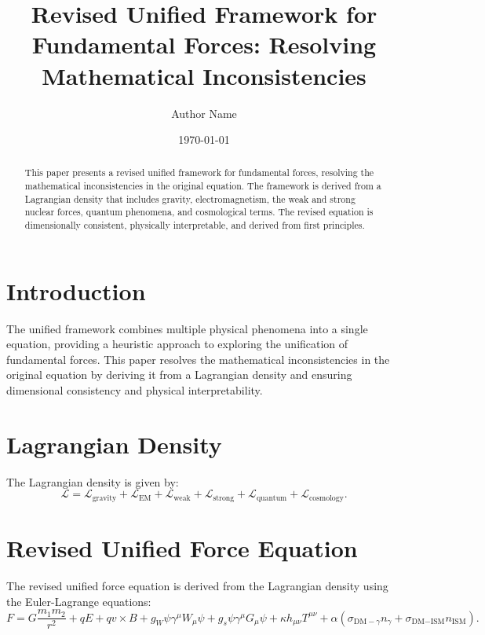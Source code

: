 \documentclass{article}
\title{Revised Unified Framework for Fundamental Forces: Resolving Mathematical Inconsistencies}
\author{Author Name}
\date{\today}
\begin{document}
\maketitle

\begin{abstract}
This paper presents a revised unified framework for fundamental forces, resolving the mathematical inconsistencies in the original equation. The framework is derived from a Lagrangian density that includes gravity, electromagnetism, the weak and strong nuclear forces, quantum phenomena, and cosmological terms. The revised equation is dimensionally consistent, physically interpretable, and derived from first principles.
\end{abstract}

\section{Introduction}
The unified framework combines multiple physical phenomena into a single equation, providing a heuristic approach to exploring the unification of fundamental forces. This paper resolves the mathematical inconsistencies in the original equation by deriving it from a Lagrangian density and ensuring dimensional consistency and physical interpretability.

\section{Lagrangian Density}
The Lagrangian density is given by:
\[
\mathcal{L} = \mathcal{L}_{\text{gravity}} + \mathcal{L}_{\text{EM}} + \mathcal{L}_{\text{weak}} + \mathcal{L}_{\text{strong}} + \mathcal{L}_{\text{quantum}} + \mathcal{L}_{\text{cosmology}}.
\]

\section{Revised Unified Force Equation}
The revised unified force equation is derived from the Lagrangian density using the Euler-Lagrange equations:
\[
F = G\frac{m_1 m_2}{r^2} + qE + qv \times B + g_W \psi \gamma^\mu W_\mu \psi + g_s \psi \gamma^\mu G_\mu \psi + \kappa h_{\mu\nu} T^{\mu\nu} + \alpha \left( \sigma_{\text{DM}-\gamma} n_{\gamma} + \sigma_{\text{DM}-\text{ISM}} n_{\text{ISM}} \right).
\]
\end{document}

